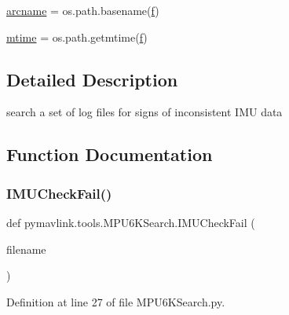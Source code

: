 \begin{DoxyCompactItemize}
\item 
\mbox{\hyperlink{namespacepymavlink_1_1tools_1_1MPU6KSearch_a363a1bdf64d3d75b1d37289d07de7386}{arcname}} = os.\+path.\+basename(\mbox{\hyperlink{namespacepymavlink_1_1tools_1_1MPU6KSearch_ac07a87a94d378396fc6958ca6fcb3064}{f}})
\item 
\mbox{\hyperlink{namespacepymavlink_1_1tools_1_1MPU6KSearch_a74dfdaae82367ac45a4be38a0a325453}{mtime}} = os.\+path.\+getmtime(\mbox{\hyperlink{namespacepymavlink_1_1tools_1_1MPU6KSearch_ac07a87a94d378396fc6958ca6fcb3064}{f}})
\end{DoxyCompactItemize}


\subsection{Detailed Description}
\begin{DoxyVerb}search a set of log files for signs of inconsistent IMU data
\end{DoxyVerb}
 

\subsection{Function Documentation}
\mbox{\label{namespacepymavlink_1_1tools_1_1MPU6KSearch_a279d987dea7583d9f989aa9cf3e8b3b7}} 
\subsubsection{\texorpdfstring{IMUCheckFail()}{IMUCheckFail()}}
{\footnotesize\ttfamily def pymavlink.\+tools.\+M\+P\+U6\+K\+Search.\+I\+M\+U\+Check\+Fail (\begin{DoxyParamCaption}\item[{}]{filename }\end{DoxyParamCaption})}



Definition at line 27 of file M\+P\+U6\+K\+Search.\+py.

\mbox{\label{namespacepymavlink_1_1tools_1_1MPU6KSearch_adb2e53c6e56de3bd2784aa39e2605d92}} 
